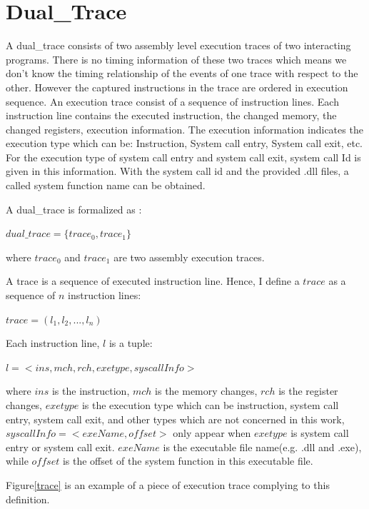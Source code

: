 \section{Dual\_Trace}
A dual\_trace consists of two assembly level execution traces of two interacting programs. There is no timing information of these two traces which means we don't know the timing relationship of the events of one trace with respect to the other. However the captured instructions in the trace are ordered in execution sequence. An execution trace consist of a sequence of instruction lines. Each instruction line contains the executed instruction, the changed memory, the changed registers, execution information. The execution information indicates the execution type which can be: Instruction, System call entry, System call exit, etc. For the execution type of system call entry and system call exit, system call Id is given in this information. With the system call id and the provided .dll files, a called system function name can be obtained. 

A dual\_trace is formalized as :

$dual\_trace = \lbrace trace_0, trace_1\rbrace$

where $trace_0$ and $trace_1$ are two assembly execution traces.

A trace is a sequence of executed instruction line. Hence, I define a $trace$ as a sequence of $n$ instruction lines:

$ trace = (l_1, l_2, ..., l_n)$ 

Each instruction line, $l$ is a tuple:

$l = <ins, mch, rch, exetype, syscallInfo>$

where $ins$ is the instruction, $mch$ is the memory changes, $rch$ is the register changes, $exetype$ is the execution type which can be instruction, system call entry, system call exit, and other types which are not concerned in this work, $syscallInfo = <exeName, offset>$ only appear when $exetype$ is system call entry or system call exit. $exeName$ is the executable file name(e.g. .dll and .exe), while $offset$ is the offset of the system function in this executable file.

Figure\ref{trace} is an example of a piece of execution trace complying to this definition. 


